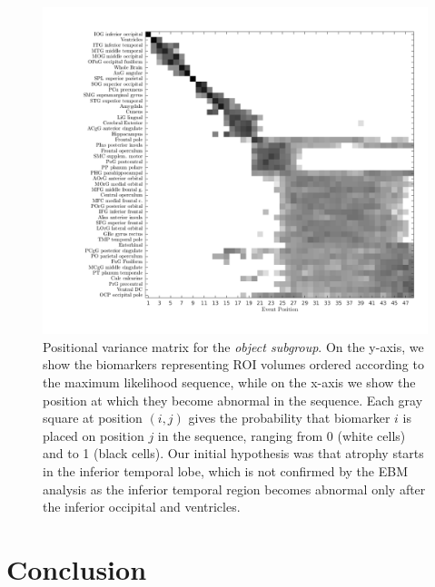 \begin{figure}[H]
 \centering
 \includegraphics[scale=0.4, trim=100 50 0 0]{images/ebm/mriAllGaussUnifDirPER/posVarianceMatrix.png}
 \caption{Positional variance matrix for the \emph{object subgroup}. On the y-axis, we show the biomarkers representing ROI volumes ordered according to the maximum likelihood sequence, while on the x-axis we show the position at which they become abnormal in the sequence. Each gray square at position $(i,j)$ gives the probability that biomarker $i$ is placed on position $j$ in the sequence, ranging from 0 (white cells) and to 1 (black cells). Our initial hypothesis was that atrophy starts in the inferior temporal lobe, which is not confirmed by the EBM analysis as the inferior temporal region becomes abnormal only after the inferior occipital and ventricles.}
   \label{fig:PER}
\end{figure}

\newcommand*{\snapLocationPER}{images/ebm/mriAllGaussUnifDirPER/snapshots} %
\newcommand*{\captionSnapEBMPER}{\caption{(a) Timing of atrophy for the \emph{object} subgroup. White regions have not been affected, while red regions have been affected by the corresponding stage.}\label{fig:SnapEBMPER}}



\section{Conclusion}

